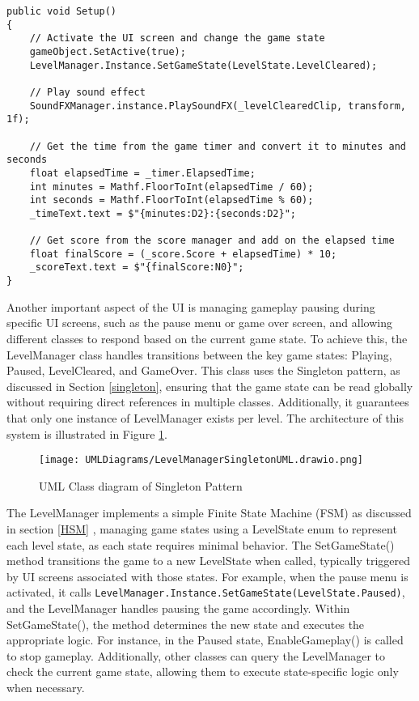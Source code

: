 \documentclass[]{final_report}
\begin{document}
\begin{verbatim}
public void Setup()
{
    // Activate the UI screen and change the game state
    gameObject.SetActive(true);
    LevelManager.Instance.SetGameState(LevelState.LevelCleared);

    // Play sound effect
    SoundFXManager.instance.PlaySoundFX(_levelClearedClip, transform, 1f);

    // Get the time from the game timer and convert it to minutes and seconds
    float elapsedTime = _timer.ElapsedTime;
    int minutes = Mathf.FloorToInt(elapsedTime / 60);
    int seconds = Mathf.FloorToInt(elapsedTime % 60);
    _timeText.text = $"{minutes:D2}:{seconds:D2}";

    // Get score from the score manager and add on the elapsed time
    float finalScore = (_score.Score + elapsedTime) * 10;
    _scoreText.text = $"{finalScore:N0}";
}
\end{verbatim}

Another important aspect of the UI is managing gameplay pausing during specific UI screens, such as the pause menu or game over screen, and allowing different classes to respond based on the current game state. To achieve this, the LevelManager class handles transitions between the key game states: Playing, Paused, LevelCleared, and GameOver.
This class uses the Singleton pattern, as discussed in Section \ref{singleton}, ensuring that the game state can be read globally without requiring direct references in multiple classes. Additionally, it guarantees that only one instance of LevelManager exists per level. The architecture of this system is illustrated in Figure \ref{fig:label_singletonLevelManager}.

\begin{figure}[H]
    \centering
    \texttt{[image: UMLDiagrams/LevelManagerSingletonUML.drawio.png]}
    \caption{UML Class diagram of Singleton Pattern}
    \label{fig:label_singletonLevelManager}
\end{figure}

The LevelManager implements a simple Finite State Machine (FSM) as discussed in section \ref{HSM} , managing game states using a LevelState enum to represent each level state, as each state requires minimal behavior. The SetGameState() method transitions the game to a new LevelState when called, typically triggered by UI screens associated with those states. For example, when the pause menu is activated, it calls \texttt{LevelManager.Instance.SetGameState(LevelState.Paused)}, and the LevelManager handles pausing the game accordingly. Within SetGameState(), the method determines the new state and executes the appropriate logic. For instance, in the Paused state, EnableGameplay() is called to stop gameplay. Additionally, other classes can query the LevelManager to check the current game state, allowing them to execute state-specific logic only when necessary.\newline
\end{document}
